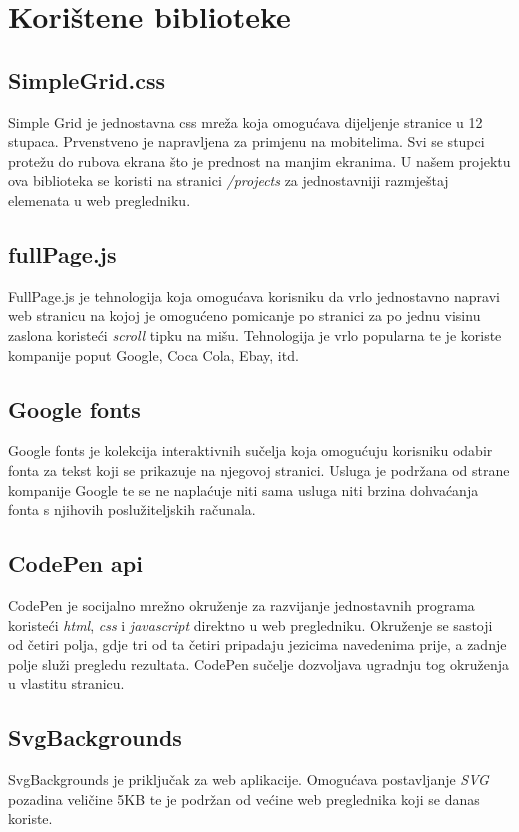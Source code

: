 \documentclass[times, utf8, zavrsni, numeric]{fer}
\begin{document}
\section{Korištene biblioteke}
\subsection{SimpleGrid.css}
\qquad Simple Grid je jednostavna css mreža koja omogućava dijeljenje stranice u 12 stupaca.
Prvenstveno je napravljena za primjenu na mobitelima. Svi se stupci protežu do rubova ekrana što je prednost na manjim ekranima.
U našem projektu ova biblioteka se koristi na stranici \textit{/projects} za jednostavniji razmještaj elemenata u web pregledniku.
\subsection{fullPage.js}
\qquad FullPage.js je tehnologija koja omogućava korisniku da vrlo jednostavno napravi web stranicu na kojoj je omogućeno pomicanje po stranici za po jednu visinu zaslona koristeći \textit{scroll} tipku\footnotemark{} na mišu.
Tehnologija je vrlo popularna te je koriste kompanije poput Google, Coca Cola, Ebay, itd.
\subsection{Google fonts}
\qquad Google fonts je kolekcija interaktivnih sučelja koja omogućuju korisniku odabir fonta za tekst koji se prikazuje na njegovoj stranici.
Usluga je podržana od strane kompanije Google te se ne naplaćuje niti sama usluga niti brzina dohvaćanja fonta s njihovih poslužiteljskih računala.
\subsection{CodePen api}
\qquad CodePen je socijalno mrežno okruženje za razvijanje jednostavnih programa koristeći \textit{html}, \textit{css} i \textit{javascript} direktno u web pregledniku.
Okruženje se sastoji od četiri polja, gdje tri od ta četiri pripadaju jezicima navedenima prije, a zadnje polje služi pregledu rezultata.
CodePen sučelje dozvoljava ugradnju tog okruženja u vlastitu stranicu.
\subsection{SvgBackgrounds}
\qquad SvgBackgrounds je priključak za web aplikacije.
Omogućava postavljanje \textit{SVG}\footnotemark{} pozadina veličine 5KB te je podržan od većine web preglednika koji se danas koriste.
\end{document}
